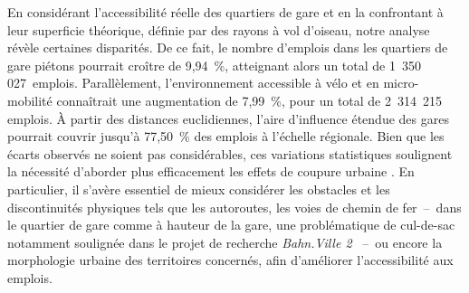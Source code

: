 \begin{refsegment}
En considérant l'accessibilité réelle des quartiers de gare et en la confrontant à leur superficie théorique, définie par des rayons à vol d'oiseau, notre analyse révèle certaines disparités. De ce fait, le nombre d'emplois dans les quartiers de gare piétons pourrait croître de 9,94~\%, atteignant alors un total de 1~350 027~emplois. Parallèlement, l'environnement accessible à vélo et en micro-mobilité connaîtrait une augmentation de 7,99~\%, pour un total de 2~314~215 emplois. À partir des distances euclidiennes, l'aire d'influence étendue des gares pourrait couvrir jusqu'à 77,50~\% des emplois à l'échelle régionale. Bien que les écarts observés ne soient pas considérables, ces variations statistiques soulignent la nécessité d'aborder plus efficacement les effets de coupure urbaine \textcolor{blue}{\autocite[4]{heran_zones_2009}}. En particulier, il s'avère essentiel de mieux considérer les obstacles et les discontinuités physiques tels que les autoroutes, les voies de chemin de fer~–~dans le quartier de gare comme à hauteur de la gare, une problématique de cul-de-sac notamment soulignée dans le projet de recherche \textsl{Bahn.Ville 2} \textcolor{blue}{\autocite[65-67]{lhostis_concevoir_2009}}~–~ou encore la morphologie urbaine des territoires concernés, afin d'améliorer l'accessibilité aux emplois.%


\end{refsegment}

